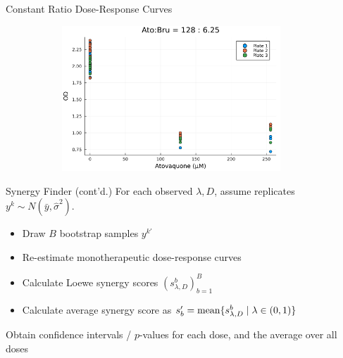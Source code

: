 \documentclass{beamer}
\begin{document}
\begin{frame}{Constant Ratio Dose-Response Curves}
\begin{figure}[b]
\begin{subfigure}{0.5\textwidth}
        \end{subfigure}%
        \begin{subfigure}{0.5\textwidth}
            \centering
            \includegraphics[width=0.9\textwidth]{figs/constant_rate_128to6.25.png}
        \end{subfigure}
    \end{figure}
\end{frame}


\begin{frame}{Synergy Finder (cont'd.)}
    For each observed $\lambda, D$, assume replicates $y^k\sim N(\bar y, \hat\sigma^2)$.
    \begin{itemize}
        \item Draw $B$ bootstrap samples $y^{k\prime}$
        \item Re-estimate monotherapeutic dose-response curves 
        \item Calculate Loewe synergy scores $(s_{\lambda, D}^b)_{b=1}^B$ 
        \item Calculate average synergy score as $s_b^\prime = {\rm mean}\{s_{\lambda, D}^b \mid \lambda\in(0,1)\}$
    \end{itemize}
    Obtain confidence intervals / $p$-values for each dose, and the average over all doses
\end{frame}
\end{document}

